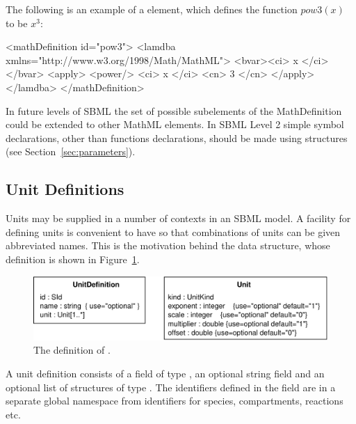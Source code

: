 \documentclass[10pt]{cekarticle}
\newcommand{\vref}[1]{\ref{#1}}
\begin{document}
The following is an example of a  element,
which defines the function $pow3(x)$ to be $x^{3}$:

\begin{example}
<mathDefinition id="pow3">
    <lamdba xmlns="http://www.w3.org/1998/Math/MathML">
        <bvar><ci> x </ci></bvar>
        <apply>
            <power/>
            <ci> x </ci>
            <cn> 3 </cn>
        </apply>
    </lamdba>
</mathDefinition>
\end{example}

In future levels of SBML the set of possible subelements of the
MathDefinition could be extended to other MathML elements.  In
SBML Level 2 simple symbol declarations, other than functions
declarations, should be made using  structures (see Section~\ref{sec:parameters}).

\subsection{Unit Definitions}
\label{sec:unitdefinitions}

Units may be supplied in a number of contexts in an SBML model.  A
facility for defining units is convenient to have so that
combinations of units can be given abbreviated names.  This is the
motivation behind the  data structure, whose
definition is shown in Figure~\vref{fig:unitdefinition}.

\begin{figure}[htb]
  \centering
  \includegraphics[scale = 0.68]{unitdefinition}
  \caption{The definition of .}
  \label{fig:unitdefinition}
\end{figure}

A unit definition consists of a  field of type
, an optional string field  and an
optional list of structures of type . The identifiers
defined in the  field are in a separate global
namespace from identifiers for species, compartments, reactions
etc.
\end{document}
